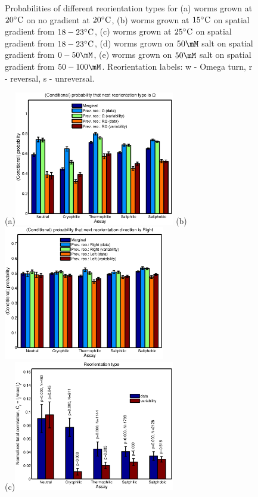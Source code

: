 \documentclass[12pt]{article}
\begin{document}
\begin{figure}
\begin{center}
  \end{center}
  \caption[Probabilities of different reorientation types.]{Probabilities of different reorientation types for (a) worms grown at $20^\circ\mathrm{C}$ on no gradient at $20^\circ\mathrm{C}$, (b) worms grown at $15^\circ\mathrm{C}$ on spatial gradient from $18-23^\circ\mathrm{C}$, (c)  worms grown at $25^\circ\mathrm{C}$ on spatial gradient from $18-23^\circ\mathrm{C}$, (d)  worms grown on $50\mM$ salt on spatial gradient from $0-50\mM$, (e)  worms grown on $50\mM$ salt on spatial gradient from $50-100\mM$.  Reorientation labels: w - Omega turn, r - reversal, s - unreversal. }\label{fig:typeprob}
\end{figure}


\begin{figure}
  \begin{center}
    (a)\includegraphics[width=7cm]{cond_type.eps}
    (b)\includegraphics[width=7cm]{cond_dir.eps}\\[1cm]
    (c)\includegraphics[width=7cm]{reotype_bin.eps}

\end{center}
\end{figure}
\end{document}
